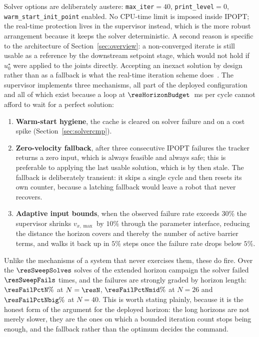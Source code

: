 \documentclass[11pt,a4paper]{article}
\begin{document}
Solver options are deliberately austere: \texttt{max\_iter}$=40$, \texttt{print\_level}$=0$,
\texttt{warm\_start\_init\_point} enabled. No CPU-time limit is imposed inside IPOPT; the real-time
protection lives in the supervisor instead, which is the more robust arrangement because it keeps the solver
deterministic. A second reason is specific to the architecture of Section~\ref{sec:overview}: a non-converged
iterate is still usable as a reference by the downstream setpoint stage, which would not hold if $u^\star_0$
were applied to the joints directly. Accepting an inexact solution by design rather than as a fallback is
what the real-time iteration scheme does~\cite{diehl2005realtime}. The supervisor implements three mechanisms, all part of the deployed
configuration and all of which exist because a loop at $\resHorizonBudget$~ms per cycle cannot afford to wait
for a perfect solution:
\begin{enumerate}[label=\arabic*.]
  \item \textbf{Warm-start hygiene}, the cache is cleared on solver failure and on a cost spike
        (Section~\ref{sec:solvercmp}).
  \item \textbf{Zero-velocity fallback}, after three consecutive IPOPT failures the tracker returns a zero
        input, which is always feasible and always safe; this is preferable to applying the last usable
        solution, which is by then stale. The fallback is deliberately transient: it skips a single cycle and
        then resets its own counter, because a latching fallback would leave a robot that never recovers.
  \item \textbf{Adaptive input bounds}, when the observed failure rate exceeds $30\%$ the supervisor
        shrinks $v_{x,\max}$ by $10\%$ through the parameter interface, reducing the distance the horizon
        covers and thereby the number of active barrier terms, and walks it back up in $5\%$ steps once the
        failure rate drops below $5\%$.
\end{enumerate}
Unlike the mechanisms of a system that never exercises them, these do fire. Over the $\resSweepSolves$ solves
of the extended horizon campaign the solver failed $\resSweepFails$ times, and the failures are strongly
graded by horizon length: $\resFailPctN\%$ at $N=\resN$, $\resFailPctNmid\%$ at $N=26$ and
$\resFailPctNbig\%$ at $N=40$. This is worth stating plainly, because it is the honest form of the argument
for the deployed horizon: the long horizons are not merely slower, they are the ones on which a bounded
iteration count stops being enough, and the fallback rather than the optimum decides the command.
\end{document}
